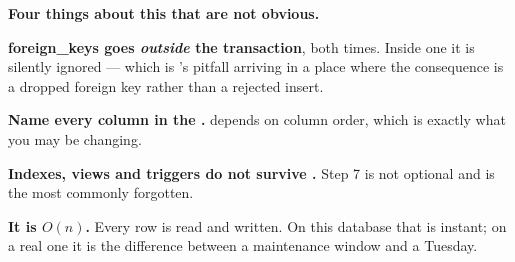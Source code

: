 \begin{worked}
\medskip
\textbf{Four things about this that are not obvious.}
\begin{tight}
  \item \textbf{ foreign\_keys goes \emph{outside} the
        transaction}, both times. Inside one it is silently ignored --- which
        is 's pitfall arriving in a place where the
        consequence is a dropped foreign key rather than a rejected insert.
  \item \textbf{Name every column in the .} 
        depends on column order, which is exactly what you may be changing.
  \item \textbf{Indexes, views and triggers do not survive .} Step 7 is not optional and is the most commonly forgotten.
  \item \textbf{It is $O(n)$.} Every row is read and written. On this
        database that is instant; on a real one it is the difference between a
        maintenance window and a Tuesday.
\end{tight}
\end{worked}

